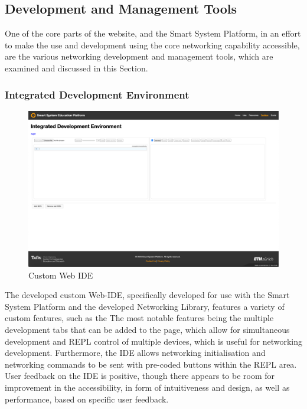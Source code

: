 \subsection{\label{sec:res_tools}Development and Management Tools}

One of the core parts of the website, and the Smart System Platform, in an effort to make the use and development using the core networking capability accessible, are the various networking development and management tools, which are examined and discussed in this Section.

\subsubsection{\label{sec:res_ide}Integrated Development Environment}

\begin{figure}[H]
    \centering
    \includegraphics[width=\linewidth]{overleaf/images/ide_raw.png}
    \vspace{\ftspace}
    \caption{Custom Web IDE}
    \vspace{\ftspace}
    \label{fig:ide_raw}
\end{figure}

The developed custom Web-IDE, specifically developed for use with the Smart System Platform and the developed Networking Library, features a variety of custom features, such as the The most notable features being the multiple development tabs that can be added to the page, which allow for simultaneous development and REPL control of multiple devices, which is useful for networking development. Furthermore, the IDE allows networking initialisation and networking commands to be sent with pre-coded buttons within the REPL area. User feedback on the IDE is positive, though there appears to be room for improvement in the accessibility, in form of intuitiveness and design, as well as performance, based on specific user feedback.


